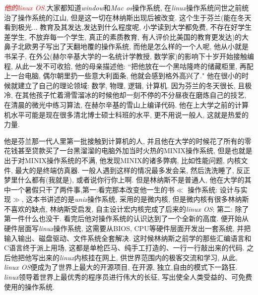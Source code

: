 \documentclass[utf8]{book}
\begin{document}
	{\Large \textcolor{red}{\textit{他的linux OS.}}}大家都知道\textit{window}和\textit{Mac os}操作系统, 在\textit{linux}操作系统问世之前统治了操作系统的江山, 但是这一切在林纳斯出现后被改变. 这个生于芬兰(能在冬天看到极光... 教育及其发达,发达到什么程度呢, 小学读到大学都免费, 不存在好学生差学生, 不放弃每一个学生, 真正的素质教育, 有人评价比美国的教育更发达)的大鼻子北欧男子写出了天翻地覆的操作系统, 而他是怎么样的一个人呢, 他从小就是书呆子, 在外公(赫尔辛基大学的一名统计学教授, 数学家)的影响下十岁开始接触编程, 从此一发不可收拾, 他的母亲描述他: ``把他放在一个黑咕隆咚的储藏柜里, 再配上一台电脑, 偶尔朝里扔一些意大利面条, 他就会感到格外高兴了." 他在很小的时候就建立了自己的理论领域: 数学, 物理, 逻辑, 计算机. 因为芬兰的冬天很长, 且极冷, 在其他孩子忙着滑雪溜冰的时候他却一刻不停的不分昼夜在磨炼自己的技艺, 在清晨的微光中练习算法, 在赫尔辛基的雪山上编译代码. 他在上大学之前的计算机水平可能是现在很多清北博士硕士科班的水平, 更不用说一般人, 这就是热爱的力量.
	
	他是芬兰那一代人里第一批接触到计算机的人, 并且他在大学的时候花了所有的零花钱甚至贷款买了一台黑溜溜的电脑外加当时火热的MINIX操作系统, 但是也就是出于对MINIX操作系统的不满, 他发现MINIX的诸多弊病, 比如性能问题, 内核文件, 最大的是终端仿真器. 一般人遇到这样的情况最多发会呆, 然后洗洗睡了, 反正梦里什么都有(我就是), 或者说你行你上啊. 但是林纳斯不是普通人, 他在大学的其中一个暑假只干了两件事,第一:看完那本改变他一生的书$\ll$ 操作系统: 设计与实现$\gg$, 这本书讲述的是\textit{unix}操作系统, 采用的是微内核, 但是微内核有很多林纳斯不喜欢的缺点, 林纳斯受启发, 自主设计宏内核完成了后来的\textit{linux OS}; 第二: 除了第一件什么也没干. 看完后他对操作系统的认识达到了一个全新的高度. 便开始从硬件层面写\textit{linux}操作系统, 这需要从BIOS, CPU等硬件层面开发出一套系统, 并把输入输出、磁盘驱动、文件系统全套解决. 这时候林纳斯之前学的那些汇编语言和C语言终于派上用场, 这都是单枪匹马、纯手工打造的、一行一行敲出来的代码. 之后他把他写出来的\textit{linux}内核挂在网上, 供世界范围内的极客交流和学习, 从此, \textit{linux OS}便成为了世界上最大的开源项目, 在开源, 独立,自由的模式下一路狂. \textit{linux}领导着世界上最优秀的程序员进行伟大的长征, 写出使全人类受益的、可免费使用的操作系统.
	
\end{document}

